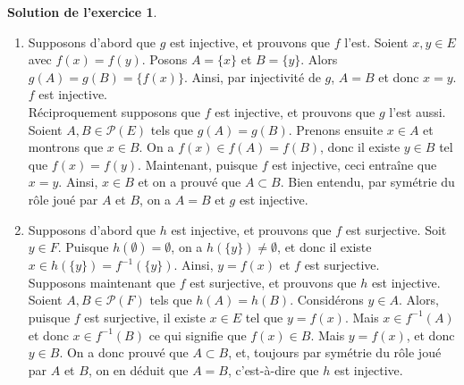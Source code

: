 \documentclass[a4paper, 11pt,openany]{article}%
\theoremstyle{plain}
\theoremstyle{definition}
\newtheorem{sol}{Solution de l'exercice}
\theoremstyle{remark}
\begin{document}
\begin{sol}
\begin{enumerate}
\item Supposons d'abord que $g$ est injective, et prouvons que $f$ l'est. Soient $x,y \in E$ avec $f(x)=f(y)$. Posons $A=\{x\}$ et $B=\{y\}$. Alors $g(A)=g(B)=\{f(x)\}$. Ainsi, par injectivité de $g$, $A=B$ et donc $x=y$. $f$ est injective.\\
Réciproquement supposons que $f$ est injective, et prouvons que $g$ l'est aussi. Soient $A,B \in \mathcal{P}(E)$ tels que $g(A)=g(B)$. Prenons ensuite $x \in A$ et montrons que $x \in B$. On a $f(x) \in f(A)=f(B)$, donc il existe $y \in B$ tel que $f(x)=f(y)$. Maintenant, puisque $f$ est injective, ceci entraîne que $x=y$. Ainsi, $x \in B$ et on a prouvé que $A \subset B$. Bien entendu, par symétrie du rôle joué par $A$ et $B$, on a $A=B$ et $g$ est injective. 
\item Supposons d'abord que $h$ est injective, et prouvons que $f$ est surjective. Soit $y \in F$. Puisque $h( \emptyset )= \emptyset$, on a $h(\{y\})\neq \emptyset$, et donc il existe $x \in h(\{y\})=f^{-1}(\{y\})$. Ainsi, $y=f(x)$ et $f$ est surjective.\\
Supposons maintenant que $f$ est surjective, et prouvons que $h$ est injective. Soient $A,B \in \mathcal{P}(F)$ tels que $h(A)=h(B)$. Considérons $y \in A$. Alors, puisque $f$ est surjective, il existe $x \in E$ tel que $y=f(x)$. Mais $x \in f^{-1} (A)$ et donc $x \in f^{-1}(B)$ ce qui signifie que $f(x) \in B$. Mais $y=f(x)$, et donc $y\in B$. On a donc prouvé que $A \subset B$, et, toujours par symétrie du rôle joué par $A$ et $B$, on en déduit que $A=B$, c'est-à-dire que $h$ est injective. 
\end{enumerate}
\end{sol}
\end{document}
